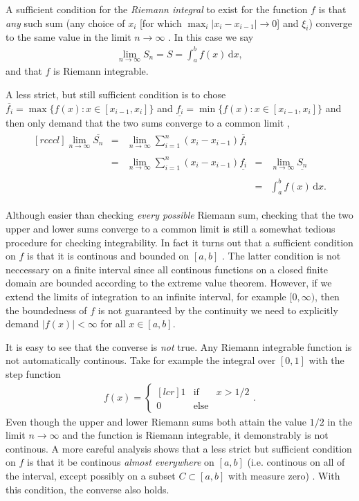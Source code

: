 \documentclass[a4paper]{article}
\newcommand{\dx}{\,\mathrm{d}x}
\newcommand{\mat} [2]{\begin{matrix}[#1]  #2 \end{matrix}}   %
\newcommand{\nn}{\nonumber}
\newcommand{\comment}[1]{\ignorespaces}
\begin{document}
A sufficient condition for the \emph{Riemann integral} to exist for the function $f$ is that \emph{any} such sum (any choice of $x_i$ [for which $\max_{i}|x_i-x_{i-1}|\rightarrow0$] and $\xi_i$) converge to the same value in the limit $n\rightarrow \infty$ \cite{davis}\comment{p7}. In this case we say
\begin{align}
\lim_{n\rightarrow \infty} S_n = S = \int_a^b f(x)\dx,
\end{align} 
and that $f$ is Riemann integrable.

A less strict, but still sufficient condition is to chose $\overline{f_i}=\max\{f(x):x\in[x_{i-1},x_i]\}$ and $\underline{f_i}=\min\{f(x):x\in[x_{i-1},x_i]\}$ and then only demand that the two sums converge to a common limit \cite{lindstrom}\comment{p366}, 
\begin{align}
\mat{rcccl}{
\displaystyle\lim_{n\rightarrow \infty}\overline{S_n} & = & \displaystyle\lim_{n\rightarrow \infty}\sum_{i=1}^n (x_i-x_{i-1})\overline{f_i} \\
% 
\\[-1em] 
%
& = & \displaystyle\lim_{n\rightarrow \infty}\sum_{i=1}^n (x_i-x_{i-1})\underline{f_i} & = & \displaystyle\lim_{n\rightarrow \infty}\underline{S_n} \\
%
\\[-1.5em] 
% 
&&&=& \displaystyle \int_a^bf(x)\dx.
}\nn
\end{align}

Although easier than checking \emph{every possible} Riemann sum, checking that the two upper and lower sums converge to a common limit is still a somewhat tedious procedure for checking integrability. In fact it turns out that a sufficient condition on $f$ is that it is continous and bounded on $[a,b]$ \cite{davis}\comment{p7}. The latter condition is not neccessary on a finite interval since all continous functions on a closed finite domain are bounded according to the extreme value theorem. However, if we extend the limits of integration to an infinite interval, for example $[0,\infty)$, then the boundedness of $f$ is not guaranteed by the continuity we need to explicitly demand $|f(x)|<\infty$ for all $x\in[a,b]$.

It is easy to see that the converse is \emph{not} true. Any Riemann integrable function is not automatically continous. Take for example the integral over $[0,1]$ with the step function 
\begin{align}
f(x) = \left\{\mat{lcr}{1 & \text{if} & x>1/2 \\ 0 & \text{else} }\right..
\end{align}
Even though the upper and lower Riemann sums both attain the value $1/2$ in the limit $n\rightarrow \infty$ and the function is Riemann integrable, it demonstrably is not continous. A more careful analysis shows that a less strict but sufficient condition on $f$ is that it be continous \emph{almost everywhere} on $[a,b]$ (i.e. continous on all of the interval, except possibly on a subset $C\subset[a,b]$ with measure zero) \cite{mcdonald}\comment{p72}. With this condition, the converse also holds.
\end{document}

